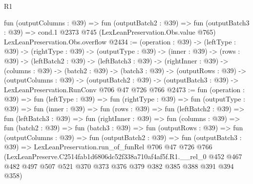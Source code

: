 \begin{lexlean}{R1}
\begin{coremodule}
  fun (outputColumns : @39) =>
  fun (outputBatch2 : @39) =>
  fun (outputBatch3 : @39) =>
  cond.{1} @2373 @745 (LexLeanPreservation.Obs.value @765) LexLeanPreservation.Obs.overflow
@2434 := (operation : @39) ->
  (leftType : @39) ->
  (rightType : @39) ->
  (outputType : @39) ->
  (inner : @39) ->
  (rows : @39) ->
  (leftBatch2 : @39) ->
  (leftBatch3 : @39) ->
  (rightInner : @39) ->
  (columns : @39) ->
  (batch2 : @39) ->
  (batch3 : @39) ->
  (outputRows : @39) ->
  (outputColumns : @39) ->
  (outputBatch2 : @39) -> (outputBatch3 : @39) -> LexLeanPreservation.RunConv @706 @47 @726 @766
@2473 := fun (operation : @39) =>
  fun (leftType : @39) =>
  fun (rightType : @39) =>
  fun (outputType : @39) =>
  fun (inner : @39) =>
  fun (rows : @39) =>
  fun (leftBatch2 : @39) =>
  fun (leftBatch3 : @39) =>
  fun (rightInner : @39) =>
  fun (columns : @39) =>
  fun (batch2 : @39) =>
  fun (batch3 : @39) =>
  fun (outputRows : @39) =>
  fun (outputColumns : @39) =>
  fun (outputBatch2 : @39) =>
  fun (outputBatch3 : @39) =>
  LexLeanPreservation.run_of_funRel
    @706
    @47
    @726
    @766
    (LexLeanPreserve.C2514fab1d6806dc52f338a710af4af5f.R1.__rel_0
      @452
      @467
      @482
      @497
      @507
      @521
      @370
      @373
      @376
      @379
      @382
      @385
      @388
      @391
      @394
      @358)
\end{coremodule}
\end{lexlean}
